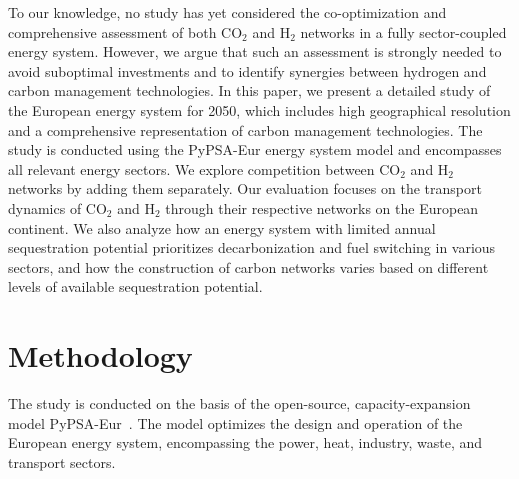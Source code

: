 \documentclass[twocolumn]{article}
\newcommand{\carbon}{CO$_2$}
\newcommand{\hydrogen}{H$_2$}
\begin{document}
To our knowledge, no study has yet considered the co-optimization and comprehensive assessment of both \carbon{} and \hydrogen{} networks in a fully sector-coupled energy system. However, we argue that such an assessment is strongly needed to avoid suboptimal investments and to identify synergies between hydrogen and carbon management technologies. In this paper, we present a detailed study of the European energy system for 2050, which includes high geographical resolution and a comprehensive representation of carbon management technologies. The study is conducted using the PyPSA-Eur energy system model and encompasses all relevant energy sectors. We explore competition between \carbon{} and \hydrogen{} networks by adding them separately. Our evaluation focuses on the transport dynamics of \carbon{} and \hydrogen{} through their respective networks on the European continent. We also analyze how an energy system with limited annual sequestration potential prioritizes decarbonization and fuel switching in various sectors, and how the construction of carbon networks varies based on different levels of available sequestration potential.


\section{Methodology}
\label{sec:methodology}

The study is conducted on the basis of the open-source, capacity-expansion model PyPSA-Eur~\cite{horschPyPSAEurOpenOptimisation2018,brownSynergiesSectorCoupling2018,PyPSAEurSecSectorCoupledOpen2023}.
The model optimizes the design and operation of the European energy system, encompassing the power, heat, industry, waste, and transport sectors.
\end{document}
